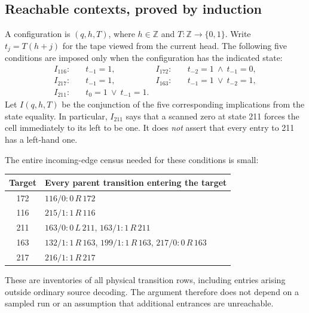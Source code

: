 \subsection{Reachable contexts, proved by induction}
\label{subsec:local208-guards}

A configuration is $(q,h,T)$, where $h\in\mathbb Z$ and
$T:\mathbb Z\to\{0,1\}$. Write $t_j=T(h+j)$ for the tape viewed from
the current head. The following five conditions are imposed only when the
configuration has the indicated state:
\begin{align*}
 I_{116}:&\quad t_{-1}=1, &
 I_{172}:&\quad t_{-2}=1\ \land\ t_{-1}=0,\\
 I_{217}:&\quad t_{-1}=1, &
 I_{163}:&\quad t_{-1}=1\ \lor\ t_{-2}=1,\\
 I_{211}:&\quad t_0=1\ \lor\ t_{-1}=1.
\end{align*}
Let $I(q,h,T)$ be the conjunction of the five corresponding implications
from the state equality. In particular, $I_{211}$ says that a scanned zero
at state 211 forces the cell immediately to its left to be one. It does
\emph{not} assert that every entry to 211 has a left-hand one.

The entire incoming-edge census needed for these conditions is small:
\begin{center}
\begin{tabular}{cl}
\toprule
Target & Every parent transition entering the target\\
\midrule
172 & $116/0:0\,R\,172$\\
116 & $215/1:1\,R\,116$\\
211 & $163/0:0\,L\,211$, \quad $163/1:1\,R\,211$\\
163 & $132/1:1\,R\,163$, \quad $199/1:1\,R\,163$,
      \quad $217/0:0\,R\,163$\\
217 & $216/1:1\,R\,217$\\
\bottomrule
\end{tabular}
\end{center}
These are inventories of all physical transition rows, including entries
arising outside ordinary source decoding. The argument therefore does not
depend on a sampled run or an assumption that additional entrances are
unreachable.

